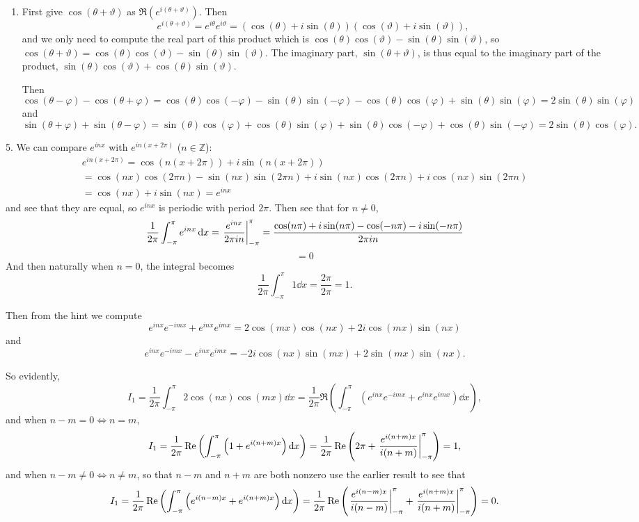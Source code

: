 \documentclass[11pt]{article}
\newcommand{\br}[1]{\left(#1\right)}
\begin{document}
\begin{enumerate}[label=(\alph*)]
  \item First give $\cos(\theta + \vartheta)$ as $\Re(e^{i(\theta + \vartheta)})$. Then \[e^{i(\theta + \vartheta)} = e^{i\theta}e^{i\vartheta} = \br{\cos(\theta) + i\sin(\theta)}\br{\cos(\vartheta) + i\sin(\vartheta)},\] and we only need to compute the real part of this product which is $\cos(\theta)\cos(\vartheta) - \sin(\theta)\sin(\vartheta)$, so $\cos(\theta + \vartheta) = \cos(\theta)\cos(\vartheta) - \sin(\theta)\sin(\vartheta)$. The imaginary part, $\sin(\theta + \vartheta)$, is thus equal to the imaginary part of the product, $\sin(\theta)\cos(\vartheta)+\cos(\theta)\sin(\vartheta)$.
  
  Then \[\cos(\theta-\varphi)-\cos(\theta +\varphi) = \cos(\theta)\cos(-\varphi) - \sin(\theta)\sin(-\varphi) - \cos(\theta)\cos(\varphi) + \sin(\theta)\sin(\varphi) = 2\sin(\theta)\sin(\varphi)\] and \[\sin(\theta+\varphi) + \sin(\theta-\varphi) = \sin(\theta)\cos(\varphi)+\cos(\theta)\sin(\varphi) + \sin(\theta)\cos(-\varphi)+\cos(\theta)\sin(-\varphi) = 2\sin(\theta)\cos(\varphi).\]
\end{enumerate}

5. We can compare $e^{inx}$ with $e^{in(x+2\pi)}$ ($n\in \mathbb{Z}$): \begin{multline*}e^{in(x+2\pi)} = \cos(n(x+2\pi)) + i\sin(n(x+2\pi)) \\ = \cos(nx)\cos(2\pi n) - \sin(nx)\sin(2\pi n) + i\sin(nx)\cos(2\pi n)+i\cos(nx)\sin(2\pi n) \\ = \cos(nx)+ i\sin(nx) = e^{inx}\end{multline*} and see that they are equal, so $e^{inx}$ is periodic with period $2\pi$. Then see that for $n \neq 0$, \[\frac{1}{2\pi}\int_{-\pi}^{\pi}e^{inx}\dd{x} = \eval{\frac{e^{inx}}{2\pi i n}}_{-\pi}^{\pi} = \frac{\cos(n\pi) + i\sin(n\pi) - \cos(-n\pi) - i\sin(-n\pi)}{2\pi i n}\] \[ = 0\] And then naturally when $n=0$, the integral becomes \[\frac{1}{2\pi}\int_{-\pi}^{\pi}1\dd{x} = \frac{2\pi}{2\pi} = 1.\]
  
Then from the hint we compute \[e^{inx}e^{-imx} + e^{inx}e^{imx} = 2 \cos(m x) \cos(n x) + 2 i \cos(m x) \sin(n x)\] and \[e^{inx}e^{-imx}-e^{inx}e^{imx} = -2 i \cos(n x) \sin(m x) + 2 \sin(m x) \sin(n x).\]

So evidently, \[I_1 = \frac{1}{2\pi}\int_{-\pi}^{\pi}2\cos(nx)\cos(mx)\dd{x} = \frac{1}{2\pi}\Re\br{\int_{-\pi}^{\pi}\br{e^{inx}e^{-imx} + e^{inx}e^{imx}}\dd{x}},\] and when $n-m = 0 \iff n = m$, \[I_1 = \frac{1}{2\pi}\Re\br{\int_{-\pi}^{\pi}\br{1 + e^{i(n+m)x}}\dd{x}} = \frac{1}{2\pi}\Re\br{2\pi + \eval{\frac{e^{i(n+m)x}}{i(n+m)}}_{-\pi}^{\pi}} = 1,\] and when $n-m \neq 0 \iff n\neq m$, so that $n-m$ and $n+m$ are both nonzero use the earlier result to see that \[I_1 = \frac{1}{2\pi}\Re\br{\int_{-\pi}^{\pi}\br{e^{i(n-m)x} + e^{i(n+m)x}}\dd{x}} = \frac{1}{2\pi}\Re\br{\eval{\frac{e^{i(n-m)x}}{i(n-m)}}_{-\pi}^{\pi} + \eval{\frac{e^{i(n+m)x}}{i(n+m)}}_{-\pi}^{\pi}} = 0.\]
\end{document}
